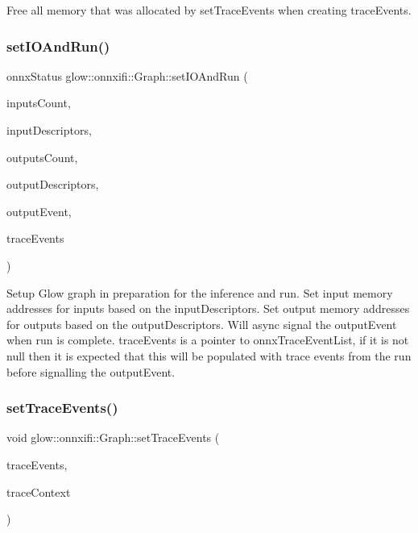 Free all memory that was allocated by set\+Trace\+Events when creating {\ttfamily trace\+Events}. \mbox{\label{classglow_1_1onnxifi_1_1_graph_a3439d113f0153c6cb41331658ed0ccc2}} 
\subsubsection{\texorpdfstring{set\+I\+O\+And\+Run()}{setIOAndRun()}}
{\footnotesize\ttfamily onnx\+Status glow\+::onnxifi\+::\+Graph\+::set\+I\+O\+And\+Run (\begin{DoxyParamCaption}\item[{uint32\+\_\+t}]{inputs\+Count,  }\item[{const onnx\+Tensor\+Descriptor\+V1 $\ast$}]{input\+Descriptors,  }\item[{uint32\+\_\+t}]{outputs\+Count,  }\item[{const onnx\+Tensor\+Descriptor\+V1 $\ast$}]{output\+Descriptors,  }\item[{\hyperlink{classglow_1_1onnxifi_1_1_event}{Event\+Ptr}}]{output\+Event,  }\item[{onnx\+Trace\+Event\+List $\ast$}]{trace\+Events }\end{DoxyParamCaption})}

Setup Glow graph in preparation for the inference and run. Set input memory addresses for inputs based on the {\ttfamily input\+Descriptors}. Set output memory addresses for outputs based on the {\ttfamily output\+Descriptors}. Will async signal the {\ttfamily output\+Event} when run is complete. {\ttfamily trace\+Events} is a pointer to onnx\+Trace\+Event\+List, if it is not null then it is expected that this will be populated with trace events from the run before signalling the output\+Event. \mbox{\label{classglow_1_1onnxifi_1_1_graph_ac767c69072721e62c27aaa443d9f0e60}} 
\subsubsection{\texorpdfstring{set\+Trace\+Events()}{setTraceEvents()}}
{\footnotesize\ttfamily void glow\+::onnxifi\+::\+Graph\+::set\+Trace\+Events (\begin{DoxyParamCaption}\item[{onnx\+Trace\+Event\+List $\ast$}]{trace\+Events,  }\item[{\hyperlink{classglow_1_1_trace_context}{Trace\+Context} $\ast$}]{trace\+Context }\end{DoxyParamCaption})\hspace{0.3cm}{\ttfamily [static]}}

